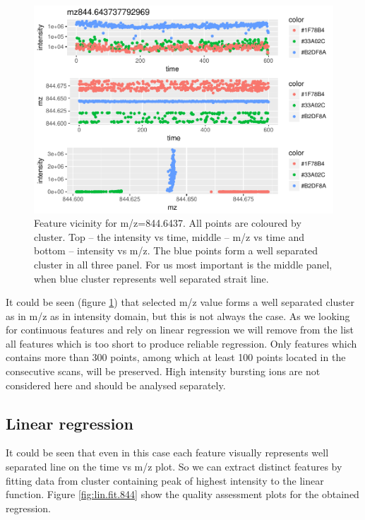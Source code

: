 \documentclass[]{article}
\begin{document}
\begin{figure}[H]
\begin{center}
\includegraphics{Supplementary_document_files/figure-latex/cluster.mz-1.pdf}
\caption{Feature vicinity for m/z=844.6437. All points are coloured by cluster. 
Top -- the intensity vs time, middle -- m/z vs time and bottom -- intensity vs m/z. 
The  blue points form a well separated cluster in all three panel. For us 
most important is the middle panel, when blue cluster represents well separated strait line.}
\label{fig:cluster.844}
\end{center}
\end{figure}

It could be seen (figure \ref{fig:cluster.844}) that selected m/z value forms a well separated cluster
as in m/z as in intensity domain, but this is not always the case. As we
looking for continuous features and rely on linear regression we will
remove from the list all features which is too short to produce reliable
regression. Only features which contains more than 300 points, among which  at least 100 
points located in the consecutive scans, will be preserved. High intensity bursting
ions are not considered here and should be analysed separately.

\subsection{Linear regression}
It could be seen that even in this case each feature visually represents
well separated line on the time vs m/z plot. So we can extract distinct
features by fitting data from cluster containing peak of highest
intensity to the linear function. Figure \ref{fig:lin.fit.844} show the quality 
assessment  plots for the obtained regression.
\end{document}
